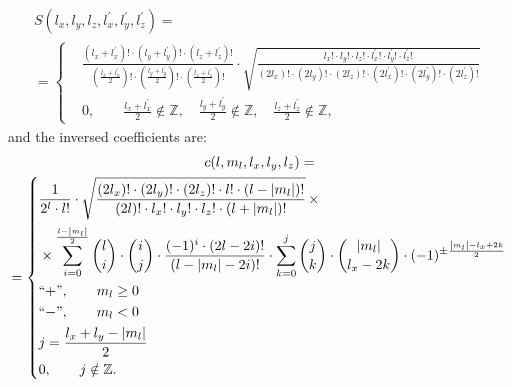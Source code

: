 \documentclass[12pt,openright,twoside,headsepline,bibtotoc]{scrbook}
\begin{document}
\begin{multline}
S(l_x, l_y, l_z, l_x^\prime, l_y^\prime, l_z^\prime) = 
\\
= \left\{
\begin{aligned}
&\frac{(l_x + l_x^\prime)! \cdot (l_y + l_y^\prime)! \cdot (l_z + l_z^\prime)! }{(\frac{l_x + l_x^\prime}{2})! \cdot (\frac{l_y + l_y^\prime}{2})! \cdot (\frac{l_z + l_z^\prime}{2})!} \cdot \sqrt{ \frac{l_x! \cdot l_y! \cdot l_z! \cdot l_x^\prime! \cdot l_y^\prime! \cdot l_z^\prime!}{(2l_x)! \cdot (2l_y)! \cdot (2l_z)! \cdot (2l_x^\prime)! \cdot (2l_y^\prime)! \cdot (2l_z^\prime)!} }
\\
&0, \qquad \frac{l_x + l_x^\prime}{2} \notin \mathbb{Z}, \quad \frac{l_y + l_y^\prime}{2} \notin \mathbb{Z}, \quad \frac{l_z + l_z^\prime}{2} \notin \mathbb{Z} ,
\end{aligned}
\right.
\end{multline}
%
and the inversed coefficients are:
%
\begin{multline}
c(l, m_l, l_x, l_y, l_z) = 
\\
= \left\{
\begin{aligned}
&\frac{1}{2^l \cdot l!} \cdot \sqrt{ \frac{(2l_x)! \cdot (2l_y)! \cdot (2l_z)! \cdot l! \cdot (l - \left| m_l \right|)!}{(2l)! \cdot l_x! \cdot l_y! \cdot l_z! \cdot (l + \left| m_l \right|)!}} \, \times
\\
&\times \sum_{i=0}^{\frac{l-\left| m_l \right|}{2}} \binom{l}{i} \cdot \binom{i}{j} \cdot \frac{(-1)^i \cdot (2l-2i)!}{(l-\left| m_l \right|-2i)!} \cdot \sum_{k=0}^j \binom{j}{k} \cdot \binom{\left| m_l \right|}{l_x-2k} \cdot (-1)^{\pm \frac{\left| m_l \right|-l_x+2k}{2}}
\\
&\text{``$+$''}, \qquad m_l \geq 0
\\
&\text{``$-$''}, \qquad m_l < 0
\\
&j = \frac{l_x + l_y - \left| m_l \right|}{2}
\\
&0, \qquad j \notin \mathbb{Z} .
\end{aligned}
\right.
\end{multline}
%
\end{document}

